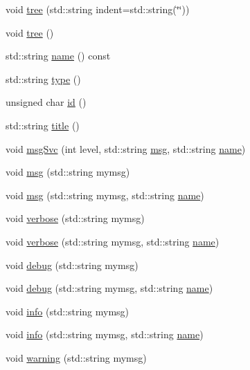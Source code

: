 \begin{DoxyCompactItemize}
\item 
void \hyperlink{classHierarchy_a76e914b9a677a22a82deb74d892bf261}{tree} (std\+::string indent=std\+::string(\char`\"{}\char`\"{}))
\item 
void \hyperlink{classHierarchy_a594c294c5f60c230e106d522ed008212}{tree} ()
\item 
std\+::string \hyperlink{classObject_a300f4c05dd468c7bb8b3c968868443c1}{name} () const
\item 
std\+::string \hyperlink{classObject_a84f99f70f144a83e1582d1d0f84e4e62}{type} ()
\item 
unsigned char \hyperlink{classObject_af99145335cc61ff6e2798ea17db009d2}{id} ()
\item 
std\+::string \hyperlink{classObject_a73a0f1a41828fdd8303dd662446fb6c3}{title} ()
\item 
void \hyperlink{classObject_a3f9d5537ebce0c0f2bf6ae4d92426f3c}{msg\+Svc} (int level, std\+::string \hyperlink{classObject_a58b2d0618c2d08cf2383012611528d97}{msg}, std\+::string \hyperlink{classObject_a300f4c05dd468c7bb8b3c968868443c1}{name})
\item 
void \hyperlink{classObject_a58b2d0618c2d08cf2383012611528d97}{msg} (std\+::string mymsg)
\item 
void \hyperlink{classObject_ac5d59299273cee27aacf7de00d2e7034}{msg} (std\+::string mymsg, std\+::string \hyperlink{classObject_a300f4c05dd468c7bb8b3c968868443c1}{name})
\item 
void \hyperlink{classObject_a83d2db2df682907ea1115ad721c1c4a1}{verbose} (std\+::string mymsg)
\item 
void \hyperlink{classObject_a2d4120195317e2a3c6532e8bb9f3da68}{verbose} (std\+::string mymsg, std\+::string \hyperlink{classObject_a300f4c05dd468c7bb8b3c968868443c1}{name})
\item 
void \hyperlink{classObject_aac010553f022165573714b7014a15f0d}{debug} (std\+::string mymsg)
\item 
void \hyperlink{classObject_a6c9a0397ca804e04d675ed05683f5420}{debug} (std\+::string mymsg, std\+::string \hyperlink{classObject_a300f4c05dd468c7bb8b3c968868443c1}{name})
\item 
void \hyperlink{classObject_a644fd329ea4cb85f54fa6846484b84a8}{info} (std\+::string mymsg)
\item 
void \hyperlink{classObject_a1ca123253dfd30fc28b156f521dcbdae}{info} (std\+::string mymsg, std\+::string \hyperlink{classObject_a300f4c05dd468c7bb8b3c968868443c1}{name})
\item 
void \hyperlink{classObject_a65cd4fda577711660821fd2cd5a3b4c9}{warning} (std\+::string mymsg)

\end{DoxyCompactItemize}
